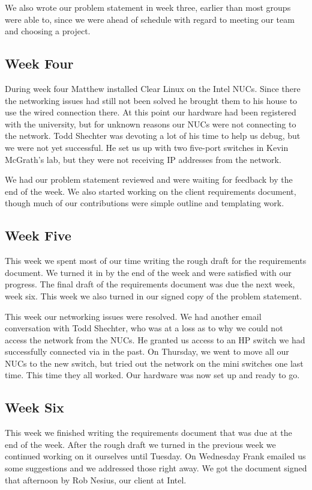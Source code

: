 \documentclass[10pt,onecolumn,journal,draftclsnofoot]{IEEEtran}
\begin{document}
We also wrote our problem statement in week three, earlier than most groups were
able to, since we were ahead of schedule with regard to meeting our team and
choosing a project.

\subsection{Week Four}

During week four Matthew installed Clear Linux on the Intel NUCs. Since there
the networking issues had still not been solved he brought them to his house to
use the wired connection there. At this point our hardware had been registered
with the university, but for unknown reasons our NUCs were not connecting to the
network. Todd Shechter was devoting a lot of his time to help us debug, but we
were not yet successful. He set us up with two five-port switches in Kevin
McGrath's lab, but they were not receiving IP addresses from the network.

We had our problem statement reviewed and were waiting for feedback by the end
of the week. We also started working on the client requirements document, though
much of our contributions were simple outline and templating work.

\subsection{Week Five}

This week we spent most of our time writing the rough draft for the requirements
document. We turned it in by the end of the week and were satisfied with our
progress. The final draft of the requirements document was due the next week,
week six. This week we also turned in our signed copy of the problem statement.

This week our networking issues were resolved. We had another email conversation
with Todd Shechter, who was at a loss as to why we could not access the network
from the NUCs. He granted us access to an HP switch we had successfully
connected via in the past. On Thursday, we went to move all our NUCs to the new
switch, but tried out the network on the mini switches one last time. This time
they all worked. Our hardware was now set up and ready to go.

\subsection{Week Six}

This week we finished writing the requirements document that was due at the end
of the week. After the rough draft we turned in the previous week we continued
working on it ourselves until Tuesday. On Wednesday Frank emailed us some
suggestions and we addressed those right away. We got the document signed that
afternoon by Rob Nesius, our client at Intel.
\end{document}
